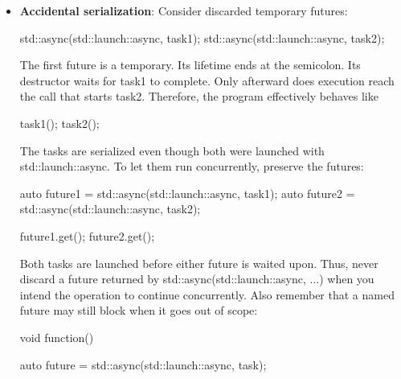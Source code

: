 \documentclass{report}
\begin{document}
\begin{itemize}
        \item \textbf{Accidental serialization}: Consider discarded temporary futures:
            \bigbreak \noindent 
            \begin{cppcode}
                std::async(std::launch::async, task1);
                std::async(std::launch::async, task2);
            \end{cppcode}
            \bigbreak \noindent 
            The first future is a temporary. Its lifetime ends at the semicolon. Its destructor waits for task1 to complete. Only afterward does execution reach the call that starts task2. Therefore, the program effectively behaves like
            \bigbreak \noindent 
            \begin{cppcode}
            task1();
            task2();
            \end{cppcode}
            \bigbreak \noindent 
            The tasks are serialized even though both were launched with std::launch::async. To let them run concurrently, preserve the futures:
            \bigbreak \noindent 
            \begin{cppcode}
                auto future1 = std::async(std::launch::async, task1);
                auto future2 = std::async(std::launch::async, task2);

                future1.get();
                future2.get();
            \end{cppcode}
            \bigbreak \noindent 
            Both tasks are launched before either future is waited upon. Thus, never discard a future returned by std::async(std::launch::async, ...) when you intend the operation to continue concurrently.
            \bigbreak \noindent 
            Also remember that a named future may still block when it goes out of scope:
            \bigbreak \noindent 
            \begin{cppcode}
                void function() {
                    auto future = std::async(std::launch::async, task);

}
\end{cppcode}
\end{itemize}
\end{document}

